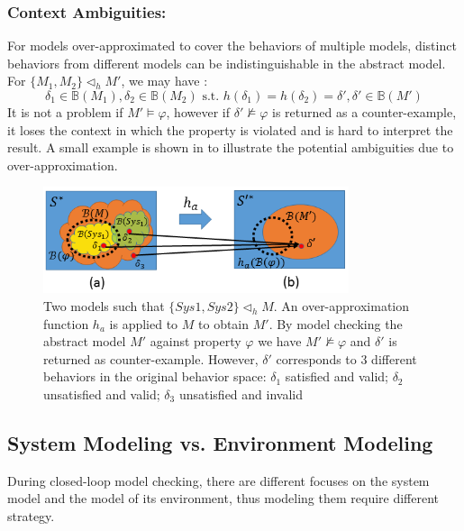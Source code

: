 \subsubsection{Context Ambiguities: }
For models over-approximated to cover the behaviors of multiple models, distinct behaviors from different models can be indistinguishable in the abstract model. For $\{M_1,M_2\}\triangleleft_h M'$, we may have :
$$ \delta_1\in\mathbb{B}(M_1),\delta_2\in \mathbb{B}(M_2)\text{ s.t. }h(\delta_1)=h(\delta_2)=\delta',\delta'\in \mathbb{B}(M')$$
It is not a problem if $M'\models\varphi$, however if $\delta'\not\models\varphi$ is returned as a counter-example, it loses the context in which the property is violated and is hard to interpret the result. A small example is shown in  to illustrate the potential ambiguities due to over-approximation. 

\begin{figure}[!t]
		\centering
		\includegraphics[width=0.8\textwidth]{figs/distinction.png}
		\caption{\small Two models such that $\{Sys1,Sys2\}\triangleleft_h M$. An over-approximation function $h_a$ is applied to $M$ to obtain $M'$. By model checking the abstract model $M'$ against property $\varphi$ we have $M'\not\models\varphi$ and $\delta'$ is returned as counter-example. However, $\delta'$ corresponds to 3 different behaviors in the original behavior space: $\delta_1$ satisfied and valid; $\delta_2$ unsatisfied and valid; $\delta_3$ unsatisfied and invalid}
		\label{fig:ambiguity}
\end{figure}

\subsection{System Modeling vs. Environment Modeling}
During closed-loop model checking, there are different focuses on the system model and the model of its environment, thus modeling them require different strategy.
